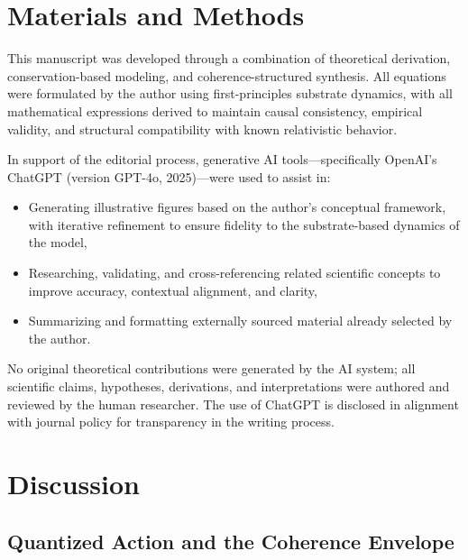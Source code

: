 \documentclass[entropy,article,submit,pdftex,oneauthor]{Definitions/mdpi}
\begin{document}
\section{Materials and Methods}
This manuscript was developed through a combination of theoretical derivation, conservation-based modeling, and coherence-structured synthesis. All equations were formulated by the author using first-principles substrate dynamics, with all mathematical expressions derived to maintain causal consistency, empirical validity, and structural compatibility with known relativistic behavior.

In support of the editorial process, generative AI tools—specifically OpenAI's ChatGPT (version GPT-4o, 2025)—were used to assist in:
\begin{itemize}
    \item Generating illustrative figures based on the author’s conceptual framework, with iterative refinement to ensure fidelity to the substrate-based dynamics of the model,
    \item Researching, validating, and cross-referencing related scientific concepts to improve accuracy, contextual alignment, and clarity,
    \item Summarizing and formatting externally sourced material already selected by the author.
\end{itemize}

No original theoretical contributions were generated by the AI system; all scientific claims, hypotheses, derivations, and interpretations were authored and reviewed by the human researcher. The use of ChatGPT is disclosed in alignment with journal policy for transparency in the writing process.


\section{Discussion}
\subsection{Quantized Action and the Coherence Envelope}
\end{document}
